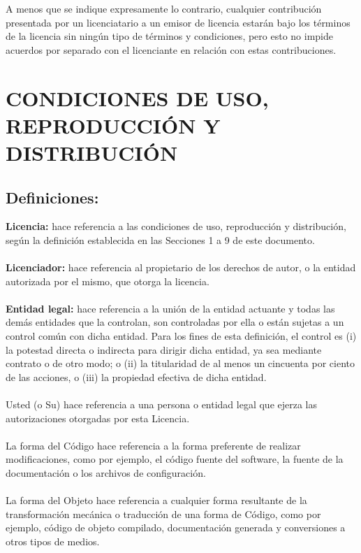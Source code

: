 A menos que se indique expresamente lo contrario, cualquier contribución presentada por un licenciatario a un emisor de licencia estarán bajo los términos de la licencia sin ningún tipo de términos y condiciones, pero esto no impide acuerdos por separado con el licenciante en relación con estas contribuciones.\\

\newpage
\chapter{CONDICIONES DE USO, REPRODUCCIÓN Y DISTRIBUCIÓN}
\section{Definiciones:}
\textbf{Licencia:} hace referencia a las condiciones de uso, reproducción y distribución, según la definición establecida en las Secciones 1 a 9 de este documento.\\\\
\textbf{Licenciador:} hace referencia al propietario de los derechos de autor, o la entidad autorizada por el mismo, que otorga la licencia.\\\\

\textbf{Entidad legal:} hace referencia a la unión de la entidad actuante y todas las demás entidades que la controlan, son controladas por ella o están sujetas a un control común con dicha entidad. Para los fines de esta definición, el control es (i) la potestad directa o indirecta para dirigir dicha entidad, ya sea mediante contrato o de otro modo; o (ii) la titularidad de al menos un cincuenta por ciento  de las acciones, o (iii) la propiedad efectiva de dicha entidad.\\\\
 
Usted (o Su) hace referencia a una persona o entidad legal que ejerza las autorizaciones otorgadas por esta Licencia.\\\\

La forma del Código hace referencia a la forma preferente de realizar modificaciones, como por ejemplo, el código fuente del software, la fuente de la documentación o los archivos de configuración.\\\\

La forma del Objeto hace referencia a cualquier forma resultante de la transformación mecánica o traducción de una forma de Código, como por ejemplo, código de objeto compilado, documentación generada y conversiones a otros tipos de medios.\\\\

